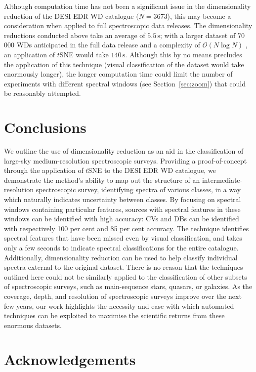 \documentclass[fleqn,usenatbib]{mnras}
\begin{document}
Although computation time has not been a significant issue in the dimensionality reduction of the DESI EDR WD catalogue ($N=3673$), this may become a consideration when applied to full spectroscopic data releases.
The dimensionality reductions conducted above take an average of $5.5\,\text{s}$; with a larger dataset of 70\,000 WDs anticipated in the full data release \citep{cooper23} and a complexity of $\mathcal{O}(N \log N)$ \citep{barneshut, vandermaaten14}, an application of $t$SNE would take $140\,\text{s}$.
Although this by no means precludes the application of this technique (visual classification of the dataset would take enormously longer), the longer computation time could limit the number of experiments with different spectral windows (see Section~\ref{sec:zoom}) that could be reasonably attempted.


\section{Conclusions}
\label{sec:conclusions}

We outline the use of dimensionality reduction as an aid in the classification of large-sky medium-resolution spectroscopic surveys.
Providing a proof-of-concept through the application of $t$SNE to the DESI EDR WD catalogue, we demonstrate the method's ability to map out the structure of an intermediate-resolution spectroscopic survey, identifying spectra of various classes, in a way which naturally indicates uncertainty between classes.
By focusing on spectral windows containing particular features, sources with spectral features in these windows can be identified with high accuracy: CVs and DBs can be identified with respectively 100 per cent and 85 per cent accuracy.
The technique identifies spectral features that have been missed even by visual classification, and takes only a few seconds to indicate spectral classifications for the entire catalogue.
Additionally, dimensionality reduction can be used to help classify individual spectra external to the original dataset.
There is no reason that the techniques outlined here could not be similarly applied to the classification of other subsets of spectroscopic surveys, such as main-sequence stars, quasars, or galaxies.
As the coverage, depth, and resolution of spectroscopic surveys improve over the next few years, our work highlights the necessity and ease with which automated techniques can be exploited to maximise the scientific returns from these enormous datasets.

\section*{Acknowledgements}
\end{document}

